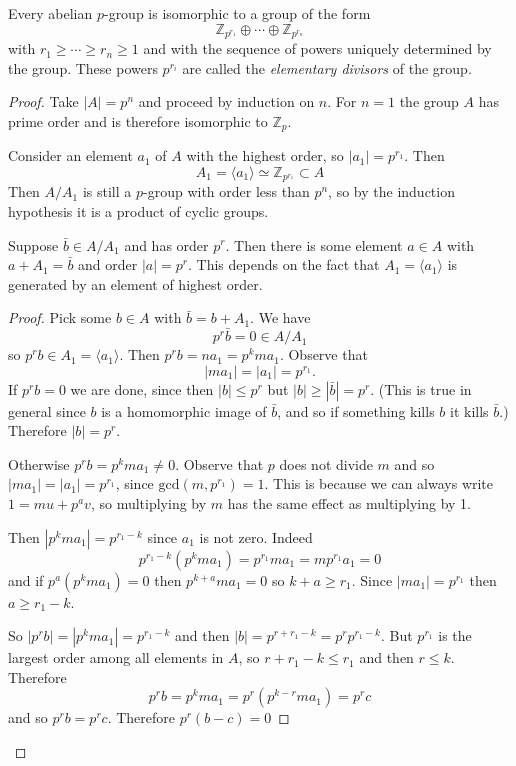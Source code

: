 \begin{theorem}
Every abelian $p$-group is isomorphic to a group of the form
$$
\mathbb{Z}_{p^{r_1}} \oplus \cdots \oplus \mathbb{Z}_{p^{r_n}}
$$
with $r_1 \geq \cdots \geq r_n \geq 1$ and with the sequence of
powers uniquely determined by the group. These powers $p^{r_i}$ are called the
\emph{elementary divisors} of the group.
\end{theorem}
\begin{proof}
Take $|A| = p^n$ and proceed by induction on $n$. For $n = 1$ the
group $A$ has prime order and is therefore isomorphic to
$\mathbb{Z}_p$.

Consider an element $a_1$ of $A$ with the highest order, so $|a_1| = p^{r_1}$. Then
$$
A_1 = \langle a_1 \rangle \simeq \mathbb{Z}_{p^{r_1}} \subset A
$$
Then $A / A_1$ is still a $p$-group with order less than $p^n$, so by
the induction hypothesis it is a product of cyclic groups.

\begin{lemma}
Suppose $\bar{b} \in A / A_1$ and has order $p^r$. Then there is some
element $a \in A$ with $a + A_1 = \bar{b}$ and order $|a| = p^r$. This
depends on the fact that $A_1 = \langle a_1 \rangle$ is generated by
an element of highest order.
\end{lemma}

\begin{proof}
Pick some $b \in A$ with $\bar{b} = b + A_1$. We have
$$
p^r \bar{b} = 0 \in A / A_1
$$
so $p^r b \in A_1 = \langle a_1 \rangle$. Then
$p^r b = n a_1 = p^k m a_1$. Observe that
$$
|m a_1| = |a_1| = p^{r_1}.
$$
If $p^r b = 0$ we are done, since then $|b| \leq p^r$ but
$|b| \geq |\bar{b}| = p^r$. (This is true in general since $b$ is a
homomorphic image of $\bar{b}$, and so if something kills $b$ it kills
$\bar{b}$.) Therefore $|b| = p^r$.

Otherwise $p^r b = p^k m a_1 \neq 0$. Observe that $p$ does not divide
$m$ and so $|m a_1| = |a_1| = p^{r_1}$, since $\mathrm{gcd}(m,
p^{r_1}) = 1$. This is because we can always write $1 = m u + p^a v$,
so multiplying by $m$ has the same effect as multiplying by 1.

Then $|p^k m a_1| = p^{r_1 - k}$
since $a_1$ is not zero. Indeed
$$
p^{r_1 - k}(p^k m a_1) = p^{r_1} m a_1 = m p^{r_1} a_1 = 0
$$
and if
$p^a (p^k m a_1) = 0$ then $p^{k + a} m a_1 = 0$ so $k + a \geq r_1$.
Since $|m a_1| = p^{r_1}$ then $a \geq r_1 - k$.

So $|p^r b| = |p^k m a_1| = p^{r_1 - k}$ and then
$|b| = p^{r + r_1 - k} = p^r p^{r_1 - k}$. But $p^{r_1}$ is the
largest order among all elements in $A$, so $r + r_1 - k \leq r_1$ and
then $r \leq k$. Therefore
$$
p^r b = p^k m a_1 = p^r (p^{k-r} m a_1) = p^r c
$$
and so $p^r b = p^r c$. Therefore $p^r (b - c) = 0$


\end{proof}
\end{proof}
